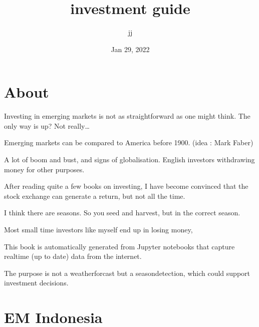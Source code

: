 \documentclass[letterpaper,10pt,english]{sphinxmanual}
\title{investment guide}
\date{Jan 29, 2022}
\author{jj}
\begin{document}
\pagestyle{empty}
\sphinxmaketitle
\pagestyle{plain}
\sphinxtableofcontents
\pagestyle{normal}
\label{\detokenize{index::doc}}



\chapter{About}
\label{\detokenize{about:about}}\label{\detokenize{about::doc}}
\sphinxAtStartPar
Investing in emerging markets is not as straightforward as one might think.
The only way is up? Not really…

\sphinxAtStartPar
Emerging markets can be compared to America before 1900. (idea : Mark Faber)

\sphinxAtStartPar
A lot of boom and bust, and signs of globalisation.
English investors withdrawing money for other purposes.

\sphinxAtStartPar
After reading quite a few books on investing, I have become convinced that the stock exchange can generate a return, but not all the time.

\sphinxAtStartPar
I think there are seasons. So you seed and harvest, but in the correct season.

\sphinxAtStartPar
Most small time investors like myself end up in losing money,

\sphinxAtStartPar
This book is automatically generated from Jupyter notebooks that capture realtime (up to date) data from the internet.

\sphinxAtStartPar
The purpose is not a weatherforcast but a season\sphinxhyphen{}detection, which could support investment decisions.


\chapter{EM Indonesia}
\label{\detokenize{indonesia:em-indonesia}}\label{\detokenize{indonesia::doc}}
\end{document}
